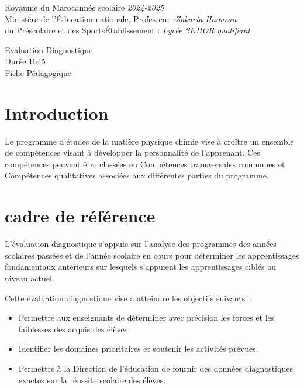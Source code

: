\documentclass[12pt]{article}
\newcommand\headerMe[2]{\noindent{}#1\hfill#2}
\begin{document}
\headerMe{Royaume du Maroc}{année scolaire \emph{2024-2025}}\\
\headerMe{Ministère de l'Éducation nationale, }{  Professeur :\emph{Zakaria Haouzan}}\\
\headerMe{du Préscolaire et des Sports}{Établissement : \emph{Lycée SKHOR qualifiant}}\\

\begin{center}
Evaluation Diagnostique \\
Durée 1h45
\\
    \vspace{.2cm}
\hrulefill
\Large{Fiche Pédagogique}
\hrulefill\\
\end{center}


\section[A]{Introduction }
\hspace{0.5cm}Le programme d'études de la matière physique chimie vise à croître un ensemble de compétences visant à développer la personnalité de l'apprenant. Ces compétences peuvent être classées en Compétences transversales communes et Compétences qualitatives associées aux différentes parties du programme.
\section{cadre de référence }
 \hspace{0.5cm}
L'évaluation diagnostique s'appuie sur l'analyse des programmes des années scolaires passées et de l'année scolaire en cours pour déterminer les apprentissages fondamentaux antérieurs sur lesquels s'appuient les apprentissages ciblés au niveau actuel.

Cette évaluation diagnostique vise à atteindre les objectifs suivants :
\begin{itemize}
	\item Permettre aux enseignants de déterminer avec précision les forces et les faiblesses des acquis des élèves.
	\item Identifier les domaines prioritaires et soutenir les activités prévues.
	\item Permettre à la Direction de l'éducation de fournir des données diagnostiques exactes sur la réussite scolaire des élèves.
\end{itemize}
\end{document}
